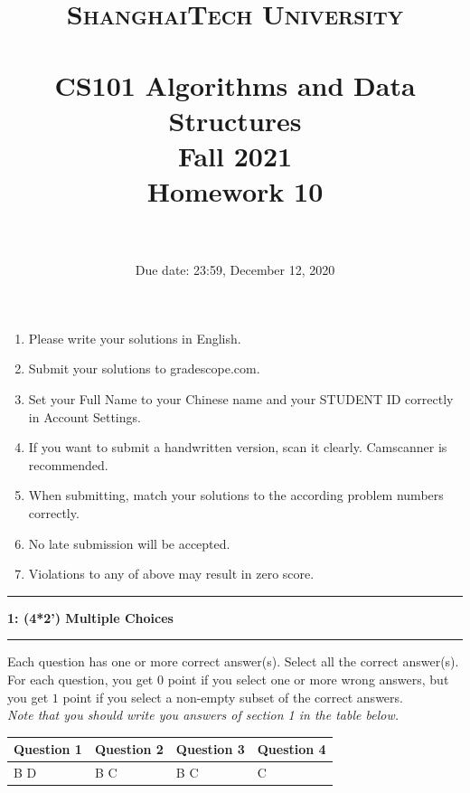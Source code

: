 \documentclass[10.5pt]{article}
\title{
	\normalfont \normalsize
	\textsc{ShanghaiTech University} \\ [25pt]
	\horrule{0.5pt} \\[0.4cm] %
	\huge CS101 Algorithms and Data Structures\\ %
	\LARGE Fall 2021\\
	\LARGE Homework 10\\
	\horrule{2pt} \\[0.5cm] %
}
\author{}
\date{Due date: 23:59, December 12, 2020}
\newcommand\question[2]{\vspace{.25in}\hrule\textbf{#1: #2}\vspace{.5em}\hrule\vspace{.10in}}
\begin{document}
\maketitle
\thispagestyle{firstpage}
\vspace{3ex}

\begin{enumerate}
	\item Please write your solutions in English.

	\item Submit your solutions to gradescope.com.

	\item Set your Full Name to your Chinese name and your STUDENT ID correctly in Account Settings.

	\item If you want to submit a handwritten version, scan it clearly. Camscanner is recommended.

	\item When submitting, match your solutions to the according problem numbers correctly.

	\item No late submission will be accepted.

	\item Violations to any of above may result in zero score.
\end{enumerate}
\newpage

\question{1}{(4*2') Multiple Choices}

Each question has one or more correct answer(s). Select all the correct answer(s). For each question, you get $0$ point if you select one or more wrong answers, but you get $1$ point if you select a non-empty subset of the correct answers.\\
\textit{Note that you should write you answers of section 1 in the table below.}
\begin{table}[htbp]
	\begin{tabular}{|p{2cm}|p{2cm}|p{2cm}|p{2cm}|}
		\hline
		Question 1 & Question 2 & Question 3 & Question 4 \\
		\hline
		B D        & B C        & B C        & C          \\
		\hline
	\end{tabular}
\end{table}
\end{document}
